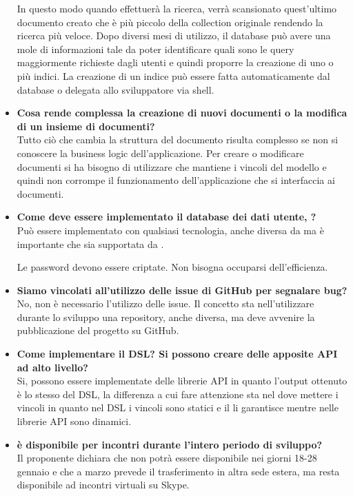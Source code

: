\begin{itemize}
In questo modo quando effettuerà la ricerca, verrà scansionato quest'ultimo documento creato che è più piccolo della collection originale rendendo la ricerca più veloce.	 
Dopo diversi mesi di utilizzo, il database può avere una mole di informazioni tale da poter identificare quali sono le query
maggiormente richieste dagli utenti e quindi proporre la creazione di uno o più indici.
La creazione di un indice può essere fatta automaticamente dal database o delegata allo sviluppatore via shell.
		
		\item
		{\bfseries Cosa rende complessa la creazione di nuovi documenti o la modifica di un insieme di documenti?} \\
		Tutto ciò che cambia la struttura del documento risulta complesso se non si conoscere la business logic dell'applicazione.
		Per creare o modificare documenti si ha bisogno di utilizzare  che mantiene i vincoli del modello e quindi non corrompe il funzionamento dell'applicazione che si interfaccia ai documenti.
		
		\item
		{\bfseries Come deve essere implementato il database dei dati utente, ?} \\
		Può essere implementato con qualsiasi tecnologia, anche diversa da  ma è importante che sia supportata da .
		
		Le password devono essere criptate.
		Non bisogna occuparsi dell'efficienza.
		
		\item
		{\bfseries Siamo vincolati all'utilizzo delle issue di GitHub per segnalare bug?} \\
		No, non è necessario l'utilizzo delle issue. 
		Il concetto sta nell'utilizzare durante lo sviluppo una repository, anche diversa, ma deve avvenire la pubblicazione del
		progetto su GitHub.
		
		\item
		{\bfseries Come implementare il DSL? Si possono creare delle apposite API ad alto livello?} \\
		Si, possono essere implementate delle librerie API in quanto l'output ottenuto è lo stesso del DSL, la differenza a cui 	fare attenzione sta nel dove mettere i vincoli in quanto nel DSL i vincoli sono statici e il  li garantisce mentre nelle librerie API sono dinamici.
		
		\item
		{\bfseries \Proponente{} è disponibile per incontri durante l'intero periodo di sviluppo?} \\
		Il proponente dichiara che non potrà essere disponibile nei giorni 18-28 gennaio e che a marzo prevede il trasferimento in
		altra sede estera, ma resta disponibile ad incontri virtuali su Skype.
				
		
	\end{itemize}